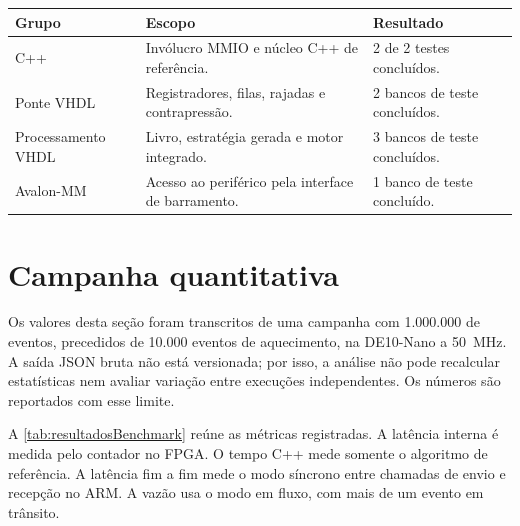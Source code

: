 \begin{tabframed}[htb]
\caption{Resultado da execução dos testes automatizados}
\label{quad:criteriosAceitacao}
\begin{tabularx}{\textwidth}{lXl}
\toprule
\textbf{Grupo} & \textbf{Escopo} & \textbf{Resultado} \\ \midrule
C++ & Invólucro MMIO e núcleo C++ de referência. & 2 de 2 testes concluídos. \\
Ponte VHDL & Registradores, filas, rajadas e contrapressão. & 2 bancos de teste concluídos. \\
Processamento VHDL & Livro, estratégia gerada e motor integrado. & 3 bancos de teste concluídos. \\
Avalon-MM & Acesso ao periférico pela interface de barramento. & 1 banco de teste concluído. \\ \bottomrule
\end{tabularx}
\end{tabframed}

\section{Campanha quantitativa}\label{sec:benchmarkDesempenho}

Os valores desta seção foram transcritos de uma campanha com 1.000.000 de eventos, precedidos de 10.000 eventos de aquecimento, na DE10-Nano a 50~MHz. A saída JSON bruta não está versionada; por isso, a análise não pode recalcular estatísticas nem avaliar variação entre execuções independentes. Os números são reportados com esse limite.

A \autoref{tab:resultadosBenchmark} reúne as métricas registradas. A latência interna é medida pelo contador no FPGA. O tempo C++ mede somente o algoritmo de referência. A latência fim a fim mede o modo síncrono entre chamadas de envio e recepção no ARM. A vazão usa o modo em fluxo, com mais de um evento em trânsito.


